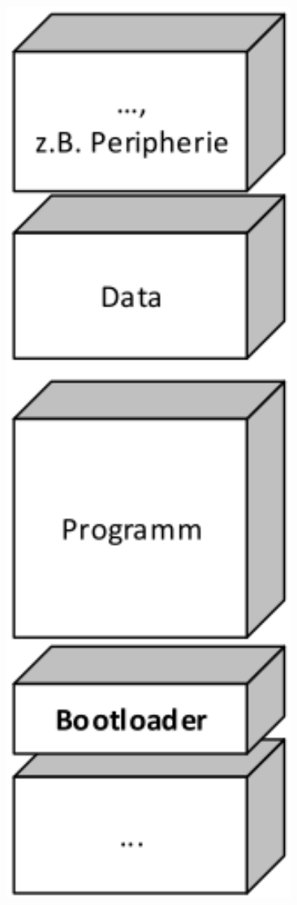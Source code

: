 \begin{minipage}[c]{3.2cm}
	\includegraphics[width=1\textwidth]{images/Bootstrap/Bootstrap}
\end{minipage}

